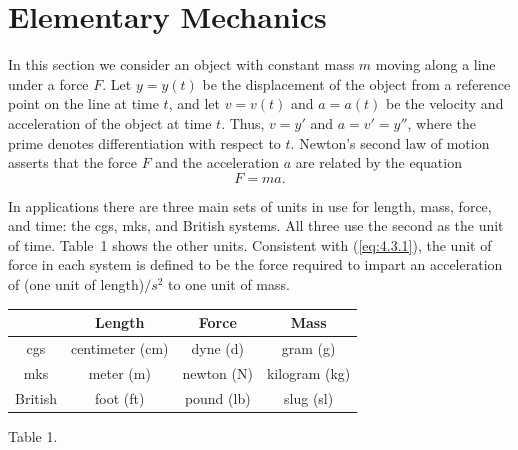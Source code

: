\section{Elementary Mechanics}


\noindent
In this section we consider an object with constant mass $m$ moving along a line under a force $F$.
Let $y=y(t)$ be the displacement of the object from a reference point on the line at time $t$, and
let $v=v(t)$ and $a=a(t)$ be the velocity and acceleration of the object at time $t$. Thus, $v=y'$
and $a=v'=y''$, where the prime denotes differentiation with respect to $t$. Newton's second law of
motion asserts that the force $F$ and the acceleration $a$ are related by the equation
\begin{equation}
  \label{eq:4.3.1}F=ma.
\end{equation}


\noindent
In applications there are three main sets of units in use for length, mass, force, and time: the
cgs, mks, and British systems. All three use the second as the unit of time. Table~1 shows the other
units. Consistent with (\ref{eq:4.3.1}), the unit of force in each system is defined to be the force
required to impart an acceleration of (one unit of length)$/s^{2}$ to one unit of mass.

\bigskip
\begin{center}
  \begin{tabular}{|c|c|c|c|}
    \hline
            & {\bf Length}    & {\bf Force} & {\bf Mass}    \\
    \hline
    cgs     & centimeter (cm) & dyne (d)    & gram (g)      \\
    \hline
    mks     & meter (m)       & newton (N)  & kilogram (kg) \\
    \hline
    British & foot (ft)       & pound (lb)  & slug (sl)     \\
    \hline
  \end{tabular}

  \medskip
  Table 1.
\end{center}

